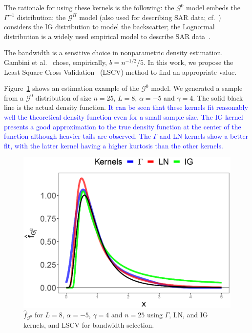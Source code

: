 \documentclass[twocolumn]{svjour3}
\begin{document}
	The rationale for using these kernels is the following:
	the $\mathcal{G}^0$ model embeds the $\Gamma^{-1}$ distribution;
	the $\mathcal{G}^H$ model (also used for describing SAR data; cf.~\cite{PolarimetricSegmentationBSplinesMSSP}) considers the IG distribution to model the backscatter;
	the Lognormal distribution is a widely used empirical model to describe SAR data~\cite{Gao2010}. 
	
	The bandwidth is a sensitive choice in nonparametric density estimation. 
	Gambini et al.~\cite{gambini2015} chose, empirically, $b=n^{-1/2}/5$. 
	In this work, we propose the Least Square Cross-Validation~\cite{Wu1997} (LSCV) method to find an appropriate value.
	
	Figure~\ref{EstimacionLNyGAyIG} shows an estimation example of the $\mathcal{G}^0$ model. 
	We generated a sample from a $\mathcal{G}^0$ distribution of size $n=25$, $L = 8$, $\alpha=-5$ and $\gamma=4$. 
	The solid black line is the actual density function. 
	\textcolor{blue}{It can be seen that these kernels fit reasonably well the theoretical density function even for a small sample size. The IG kernel presents a good approximation to the true density function at the center of the function although heavier tails are observed. The $\Gamma$ and LN kernels show a better fit, with the latter kernel having a higher kurtosis than the other kernels.}
	
	\begin{figure}[hbt]
		\centering
		\includegraphics[scale=0.35]{../../../Figures/PaperTesis/NucleosGALNyIG.eps}
		\caption{$\widehat{f}_{\mathcal{G}^0}$ for $L=8$, $\alpha=-5$, $\gamma=4$ and $n=25$ using $\Gamma$, LN, and IG kernels, and LSCV for bandwidth selection.}\label{EstimacionLNyGAyIG}
	\end{figure}
	
\end{document}
